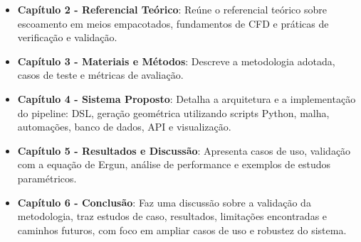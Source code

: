 \begin{itemize}
    \item \textbf{Capítulo 2 - Referencial Teórico}: Reúne o referencial teórico sobre escoamento em meios empacotados, fundamentos de CFD e práticas de verificação e validação.
    
    \item \textbf{Capítulo 3 - Materiais e Métodos}: Descreve a metodologia adotada, casos de teste e métricas de avaliação.
    
    \item \textbf{Capítulo 4 - Sistema Proposto}: Detalha a arquitetura e a implementação do pipeline: DSL, geração geométrica utilizando scripts Python, malha, automações, banco de dados, API e visualização.
    
    \item \textbf{Capítulo 5 - Resultados e Discussão}: Apresenta casos de uso, validação com a equação de Ergun, análise de performance e exemplos de estudos paramétricos.
    
    \item \textbf{Capítulo 6 - Conclusão}: Faz uma discussão sobre a validação da metodologia, traz estudos de caso, resultados, limitações encontradas e caminhos futuros, com foco em ampliar casos de uso e robustez do sistema.
\end{itemize}

